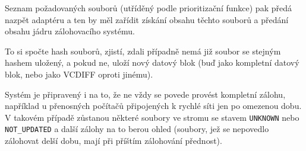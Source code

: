 Seznam požadovaných souborů (utříděný podle prioritizační funkce) pak předá
nazpět adaptéru a ten by měl zařídit získání obsahu těchto souborů a předání
obsahu jádru zálohovacího systému.

To si spočte hash souborů, zjistí, zdali případně nemá již soubor se stejným
hashem uložený, a pokud ne, uloží nový datový blok (buď jako kompletní datový
blok, nebo jako \gls{VCDIFF} oproti jinému).

Systém je připravený i na to, že ne vždy se povede provést kompletní zálohu,
například u přenosných počítačů připojených k rychlé síti jen po omezenou dobu.
V takovém případě zůstanou některé soubory ve stromu se stavem \texttt{UNKNOWN}
nebo \texttt{NOT\_UPDATED} a další zálohy na to berou ohled (soubory, jež se
nepovedlo zálohovat delší dobu, mají při příštím zálohování přednost).
